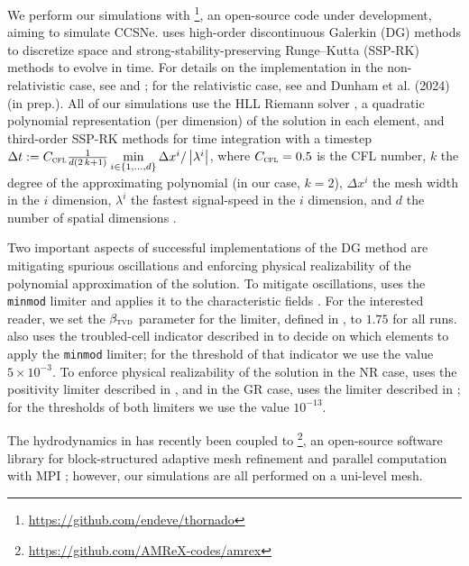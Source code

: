 We perform our simulations with \thornado{}%
\footnote{\url{https://github.com/endeve/thornado}},
an open-source code under development,
aiming to simulate CCSNe.
\thornado{} uses high-order discontinuous Galerkin (DG) methods
to discretize space and strong-stability-preserving Runge--Kutta
(SSP-RK) methods to evolve in time.
For details on the implementation in the non-relativistic case,
see \citet{ebd2019} and \citet{pbe2021};
for the relativistic case, see \citet{dem2020} and
Dunham et al. (2024) (in prep.).
All of our simulations use the HLL Riemann solver \citep{hll1983},
a quadratic polynomial representation (per dimension) of the
solution in each element, and
third-order SSP-RK methods for time integration \citep{gst2001}
with a timestep
$\Delta t
:=C_{\textsc{cfl}}
\frac{1}{d\left(2\,k+1\right)}
\min\limits_{i\in\left\{1,\ldots,d\right\}}
\Delta x^{i}/\left|\lambda^{i}\right|$,
where $C_{\textsc{cfl}}=0.5$ is the CFL number,
$k$ the degree of the approximating polynomial (in our case, $k=2$),
$\Delta x^{i}$ the mesh width in the $i$\th{} dimension,
$\lambda^{i}$ the fastest signal-speed in the $i$\th{} dimension,
and $d$ the number of spatial dimensions \citep{cs2001}.

Two important aspects of successful implementations of
the DG method are mitigating spurious
oscillations and enforcing physical realizability
of the polynomial approximation of the solution.
To mitigate oscillations, \thornado{} uses the \texttt{minmod}
limiter and applies it to the characteristic fields
\citep[see, e.g.,][]{s1987,pbe2021}.
For the interested reader, we set the $\beta_{\textsc{tvd}}$ parameter
for the limiter, defined in \citet{pbe2021}, to $1.75$ for all runs.
\thornado{} also uses the troubled-cell indicator described
in \cite{fs2017} to decide on which
elements to apply the \texttt{minmod} limiter;
for the threshold of that indicator
we use the value $5\times10^{-3}$.
To enforce physical realizability of the solution in the NR case,
\thornado{} uses the positivity limiter described in \citet{zs2010},
and in the GR case, uses the limiter described in \citet{qsy2016};
for the thresholds of both limiters we use the value $10^{-13}$.

The hydrodynamics in \thornado{} has recently been coupled to
\amrex{}\footnote{\url{https://github.com/AMReX-codes/amrex}},
an open-source software library for block-structured adaptive
mesh refinement and parallel computation with MPI \citep{z2019};
however, our simulations are all performed on a uni-level mesh.

